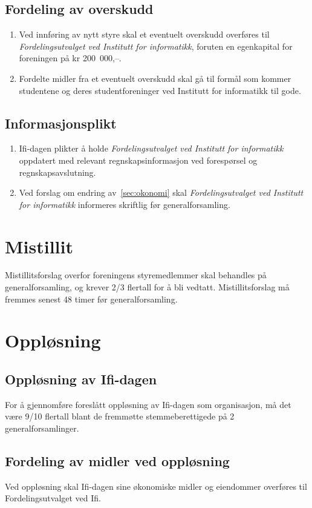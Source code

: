 \documentclass[norsk,a4paper]{article}
\begin{document}
\subsection{Fordeling av overskudd}
\begin{enumerate}
	\item Ved innføring av nytt styre skal et eventuelt overskudd overføres til \textit{Fordelingsutvalget ved Institutt for informatikk}, foruten en egenkapital for foreningen på kr 200~000,--. 
	\item Fordelte midler fra et eventuelt overskudd skal gå til formål som kommer studentene og deres studentforeninger ved Institutt for informatikk til gode.
\end{enumerate}

\subsection{Informasjonsplikt}
\begin{enumerate}
	\item Ifi-dagen plikter å holde \textit{Fordelingsutvalget ved Institutt for informatikk} oppdatert med relevant regnskapsinformasjon ved forespørsel og regnskapsavslutning.
	\item Ved forslag om endring av~\ref{sec:okonomi} skal \textit{Fordelingsutvalget ved Institutt for informatikk} informeres skriftlig før generalforsamling.
\end{enumerate}

\section{Mistillit}
Mistillitsforslag overfor foreningens styremedlemmer skal behandles på generalforsamling, og krever 2/3 flertall for å bli vedtatt. Mistillitsforslag må fremmes senest 48 timer før generalforsamling.

\section{Oppløsning}
\subsection{Oppløsning av Ifi-dagen}
For å gjennomføre foreslått oppløsning av Ifi-dagen som organisasjon, må det være 9/10 flertall
blant de fremmøtte stemmeberettigede på 2 generalforsamlinger.

\subsection{Fordeling av midler ved oppløsning}
Ved oppløsning skal Ifi-dagen sine økonomiske midler og eiendommer overføres til
Fordelingsutvalget ved Ifi.\label{ref:lastpage}
\end{document}

